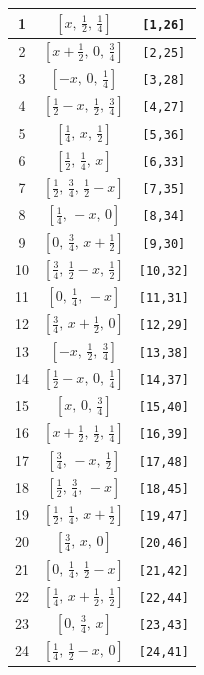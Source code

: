 \documentclass[fleqn,8pt]{jsarticle}
\begin{document}
\begin{longtable}{ccc}
1 & $\left[ x,\, \frac{1}{2},\, \frac{1}{4} \right]$ & {\tt [1,26]} \\ \hline
2 & $\left[ x + \frac{1}{2},\, 0,\, \frac{3}{4} \right]$ & {\tt [2,25]} \\ \hline
3 & $\left[ - x,\, 0,\, \frac{1}{4} \right]$ & {\tt [3,28]} \\ \hline
4 & $\left[ \frac{1}{2} - x,\, \frac{1}{2},\, \frac{3}{4} \right]$ & {\tt [4,27]} \\ \hline
5 & $\left[ \frac{1}{4},\, x,\, \frac{1}{2} \right]$ & {\tt [5,36]} \\ \hline
6 & $\left[ \frac{1}{2},\, \frac{1}{4},\, x \right]$ & {\tt [6,33]} \\ \hline
7 & $\left[ \frac{1}{2},\, \frac{3}{4},\, \frac{1}{2} - x \right]$ & {\tt [7,35]} \\ \hline
8 & $\left[ \frac{1}{4},\, - x,\, 0 \right]$ & {\tt [8,34]} \\ \hline
9 & $\left[ 0,\, \frac{3}{4},\, x + \frac{1}{2} \right]$ & {\tt [9,30]} \\ \hline
10 & $\left[ \frac{3}{4},\, \frac{1}{2} - x,\, \frac{1}{2} \right]$ & {\tt [10,32]} \\ \hline
11 & $\left[ 0,\, \frac{1}{4},\, - x \right]$ & {\tt [11,31]} \\ \hline
12 & $\left[ \frac{3}{4},\, x + \frac{1}{2},\, 0 \right]$ & {\tt [12,29]} \\ \hline
13 & $\left[ - x,\, \frac{1}{2},\, \frac{3}{4} \right]$ & {\tt [13,38]} \\ \hline
14 & $\left[ \frac{1}{2} - x,\, 0,\, \frac{1}{4} \right]$ & {\tt [14,37]} \\ \hline
15 & $\left[ x,\, 0,\, \frac{3}{4} \right]$ & {\tt [15,40]} \\ \hline
16 & $\left[ x + \frac{1}{2},\, \frac{1}{2},\, \frac{1}{4} \right]$ & {\tt [16,39]} \\ \hline
17 & $\left[ \frac{3}{4},\, - x,\, \frac{1}{2} \right]$ & {\tt [17,48]} \\ \hline
18 & $\left[ \frac{1}{2},\, \frac{3}{4},\, - x \right]$ & {\tt [18,45]} \\ \hline
19 & $\left[ \frac{1}{2},\, \frac{1}{4},\, x + \frac{1}{2} \right]$ & {\tt [19,47]} \\ \hline
20 & $\left[ \frac{3}{4},\, x,\, 0 \right]$ & {\tt [20,46]} \\ \hline
21 & $\left[ 0,\, \frac{1}{4},\, \frac{1}{2} - x \right]$ & {\tt [21,42]} \\ \hline
22 & $\left[ \frac{1}{4},\, x + \frac{1}{2},\, \frac{1}{2} \right]$ & {\tt [22,44]} \\ \hline
23 & $\left[ 0,\, \frac{3}{4},\, x \right]$ & {\tt [23,43]} \\ \hline
24 & $\left[ \frac{1}{4},\, \frac{1}{2} - x,\, 0 \right]$ & {\tt [24,41]} \\
\end{longtable}
\end{document}
